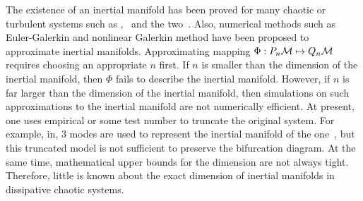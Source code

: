 The existence of an inertial manifold has been proved
for many chaotic or turbulent systems such as \KSe, \cGLe\ and
the two\dmn\ \NSe{}.
Also, numerical methods such as Euler-Galerkin and nonlinear
Galerkin method have been proposed to approximate
inertial manifolds. Approximating
mapping $\Phi:P_n\mathcal{M}\mapsto Q_n\mathcal{M}$ requires choosing an appropriate $n$ first.
If $n$ is smaller than the dimension of the inertial manifold, then $\Phi$
fails to describe the inertial manifold. However, if $n$
is far larger than the dimension of the inertial manifold, then simulations on
such approximations to the inertial manifold
are not numerically efficient.
At present, one uses empirical or some test number to truncate the
original system. For example, in, 3 modes are
used to represent the inertial manifold of the one\dmn\ \KSe, but this
truncated model is not sufficient to preserve the bifurcation diagram.
At the same time, mathematical upper bounds for the dimension are not always tight.
Therefore, little is known about the exact dimension of inertial manifolds in
dissipative chaotic systems.
